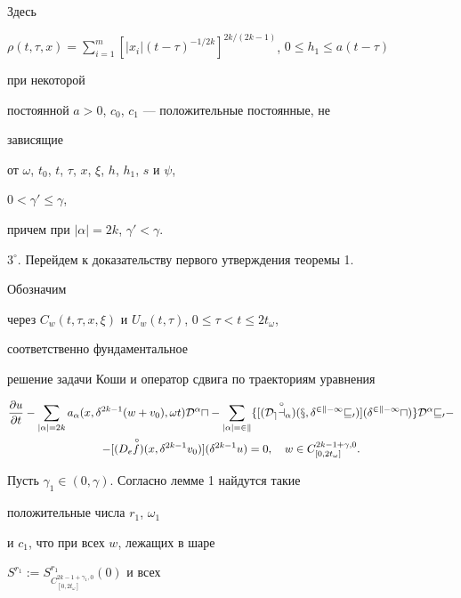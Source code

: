Здесь 


$\rho(t,\tau,x)=\sum\limits^m_{i=1}[|x_i|(t-\tau)^{-1/2k} 


]^{2k/(2k-1)}$, $0\le h_1\le a(t-\tau)$ 


при некоторой 


постоянной $a>0$, $c_0$, $c_1$ --- положительные постоянные, не 


зависящие 


от $\omega$, $t_0$, $t$, $\tau$, $x$, $\xi$, $h$, $h_1$, $s$ и $\psi$, 


$0<\gamma'\le\gamma$, 


причем при $|\alpha|=2k$, $\gamma'<\gamma$. 


\medskip 


 


$3^\circ$. Перейдем к доказательству первого утверждения теоремы 1. 


Обозначим 


через $C_w(t,\tau,x,\xi)$ и $U_w(t,\tau)$, $0\le\tau<t\le2t_\omega$, 


соответственно фундаментальное 


решение задачи Коши и оператор сдвига по траекториям уравнения 


\begin{multline*} 


\frac{\partial u}{\partial t}-\sum_{|\alpha|=2k}a_\alpha 


(x,\delta^{2k-1}(w+v_0),\omega t) 


\cal D^\alpha u-\sum_{|\alpha|=2k} 


\{[(D_e\up{\circ}{a}_\alpha)(x,\delta^{2k-1}v_0)] 


(\delta^{2k-1}u)\}\cal D^\alpha v_0- \\ 


% 


-[(D_e\up{\,\circ}{f})(x,\delta^{2k-1}v_0)] 


(\delta^{2k-1}u)=0,\quad w\in C^{2k-1+\gamma,0}_{[0,2t_\omega]}. 


\end{multline*} 


Пусть $\gamma_1\in(0,\gamma)$. Согласно лемме 1 найдутся такие 


положительные числа $r_1$, $\omega_1$ 


и $c_1$, что при всех $w$, лежащих в шаре 


$S^{r_1}:=S^{r_1}_{C^{2k-1+\gamma_1,0}_{[0,2t_\omega]}}(0)$ и всех 


